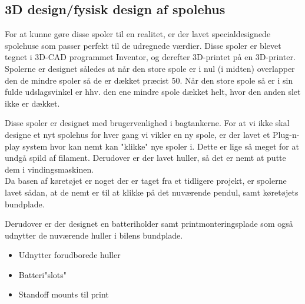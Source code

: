 


 






\subsection{3D design/fysisk design af spolehus}
For at kunne gøre disse spoler til en realitet, er der lavet specialdesignede spolehuse som passer perfekt til de udregnede værdier. Disse spoler er blevet tegnet i 3D-CAD programmet Inventor, og derefter 3D-printet på en 3D-printer. \\

Spolerne er designet således at når den store spole er i nul (i midten) overlapper den de mindre spoler så de er dækket præcist 50\percent. Når den store spole så er i sin fulde udslagsvinkel er hhv. den ene mindre spole dækket helt, hvor den anden slet ikke er dækket. \\


Disse spoler er designet med brugervenlighed i bagtankerne. For at vi ikke skal designe et nyt spolehus for hver gang vi vikler en ny spole, er der lavet et Plug-n-play system hvor kan nemt kan "klikke" nye spoler i. Dette er lige så meget for at undgå spild af filament. Derudover er der lavet huller, så det er nemt at putte dem i vindingsmaskinen. \\

Da basen af køretøjet er noget der er taget fra et tidligere projekt, er spolerne lavet sådan, at de nemt er til at klikke på det nuværende pendul, samt køretøjets bundplade. \\


Derudover er der designet en batteriholder samt printmonteringsplade som også udnytter de nuværende huller i bilens bundplade. 

\begin {itemize}
\item Udnytter forudborede huller
\item Batteri"slots"
\item Standoff mounts til print
\end {itemize}